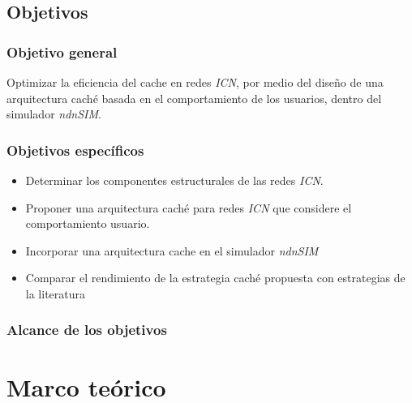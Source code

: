\documentclass[12pt]{ociamthesis}  %
\begin{document}
\section{Objetivos}
\subsection{Objetivo general}
Optimizar la eficiencia del cache en redes \textit{ICN}, por medio del diseño de una arquitectura caché basada en el comportamiento de los usuarios, dentro del simulador \textit{ndnSIM}.

\subsection{Objetivos específicos}
\begin{itemize}
	\item Determinar los componentes estructurales de las redes \textit{ICN}.
	\item Proponer una arquitectura caché para redes \textit{ICN} que considere el comportamiento usuario.
	\item Incorporar una arquitectura cache en el simulador \textit{ndnSIM}
	\item Comparar el rendimiento de la estrategia caché propuesta con estrategias de la literatura
\end{itemize}

\subsection{Alcance de los objetivos}

\chapter{Marco teórico}
\end{document}
